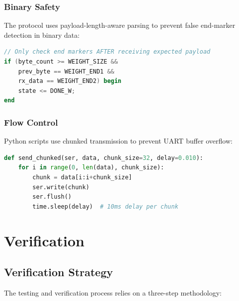 \documentclass[12pt,a4paper]{report}
\begin{document}
\newpage

\subsection{Binary Safety}

The protocol uses payload-length-aware parsing to prevent false end-marker detection in binary data:

\begin{lstlisting}[language=Verilog, caption=Binary-Safe Marker Detection]
// Only check end markers AFTER receiving expected payload
if (byte_count >= WEIGHT_SIZE &&
    prev_byte == WEIGHT_END1 &&
    rx_data == WEIGHT_END2) begin
    state <= DONE_W;
end
\end{lstlisting}

\subsection{Flow Control}

Python scripts use chunked transmission to prevent UART buffer overflow:

\begin{lstlisting}[language=Python, caption=Chunked Transmission]
def send_chunked(ser, data, chunk_size=32, delay=0.010):
    for i in range(0, len(data), chunk_size):
        chunk = data[i:i+chunk_size]
        ser.write(chunk)
        ser.flush()
        time.sleep(delay)  # 10ms delay per chunk
\end{lstlisting}

\chapter{Verification}

\section{Verification Strategy}

The testing and verification process relies on a three-step methodology:
\end{document}
